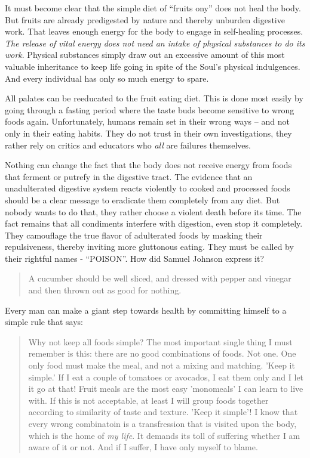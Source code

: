\documentclass[landscape,twocolumn,letterpaper]{article}
\begin{document}
It must become clear that the simple diet of ``fruits ony'' does not
heal the body. But fruits are already predigested by nature and
thereby unburden digestive work. That leaves enough energy for the
body to engage in self-healing processes. \emph{The release of vital
energy does not need an intake of physical substances to do its
work}. Physical substances simply draw out an excessive amount of this
most valuable inheritance to keep life going in spite of the Soul's
physical indulgences. And every individual has only so much energy to
spare.

All palates can be reeducated to the fruit eating diet. This is done
most easily by going through a fasting period where the taste buds
become sensitive to wrong foods again. Unfortunately, humans remain
set in their wrong ways -- and not only in their eating habits. They
do not trust in their own investigations, they rather rely on critics
and educators who \emph{all} are failures themselves.

Nothing can change the fact that the body does not receive energy from
foods that ferment or putrefy in the digestive tract. The evidence
that an unadulterated digestive system reacts violently to cooked and
processed foods should be a clear message to eradicate them completely
from any diet. But nobody wants to do that, they rather choose a
violent death before its time. The fact remains that all condiments
interfere with digestion, even stop it completely. They camouflage the
true flavor of adulterated foods by masking their repulsiveness,
thereby inviting more gluttonous eating. They must be called by their
rightful names - ``POISON''. How did Samuel Johnson express it?
\begin{quote} A cucumber should be well sliced, and dressed with
pepper and vinegar and then thrown out as good for nothing.
\end{quote} Every man can make a giant step towards health by
committing himself to a simple rule that says:
\begin{quote} Why not keep all foods simple? The most important single
thing I must remember is this: there are no good combinations of
foods. Not one. One only food must make the meal, and not a mixing and
matching. 'Keep it simple.' If I eat a couple of tomatoes or avocados,
I eat them only and I let it go at that! Fruit meals are the most easy
'monomeals' I can learn to live with. If this is not acceptable, at
least I will group foods together according to similarity of taste and
texture. 'Keep it simple'! I know that every wrong combinatoin is a
transfression that is visited upon the body, which is the home of
\emph{my life}. It demands its toll of suffering whether I am aware of
it or not. And if I suffer, I have only myself to blame.
\end{quote}
\end{document}
